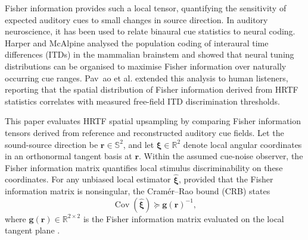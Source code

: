 \documentclass[journal]{IEEEtran}
\begin{document}
Fisher information provides such a local tensor, quantifying the sensitivity of expected auditory cues to small changes in source direction. In auditory neuroscience, it has been used to relate binaural cue statistics to neural coding. Harper and McAlpine \cite{Harper2004} analysed the population coding of interaural time differences (ITDs) in the mammalian brainstem and showed that neural tuning distributions can be organised to maximise Fisher information over naturally occurring cue ranges. Pav~ao et al. \cite{Pavao2020} extended this analysis to human listeners, reporting that the spatial distribution of Fisher information derived from HRTF statistics correlates with measured free-field ITD discrimination thresholds.

This paper evaluates HRTF spatial upsampling by comparing Fisher information tensors derived from reference and reconstructed auditory cue fields. Let the sound-source direction be \(\mathbf{r}\in\mathbb{S}^2\), and let \(\boldsymbol{\xi}\in\mathbb{R}^{2}\) denote local angular coordinates in an orthonormal tangent basis at \(\mathbf{r}\). Within the assumed cue-noise observer, the Fisher information matrix quantifies local stimulus discriminability on these coordinates. For any unbiased local estimator \(\hat{\boldsymbol{\xi}}\), provided that the Fisher information matrix is nonsingular, the Cram\'er--Rao bound (CRB) states
\begin{equation}
\operatorname{Cov}(\hat{\boldsymbol{\xi}}) \succeq \mathbf{g}(\mathbf{r})^{-1},
\end{equation}
where \(\mathbf{g}(\mathbf{r})\in\mathbb{R}^{2\times2}\) is the Fisher information matrix evaluated on the local tangent plane \cite{Dayan2001}.
\end{document}
